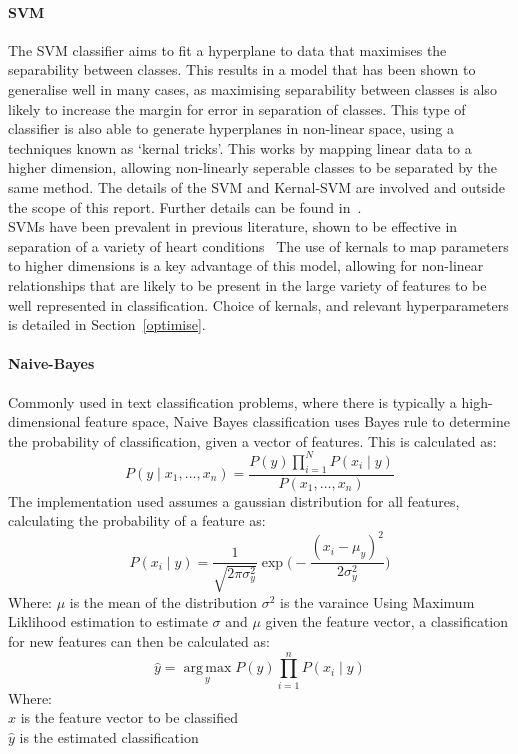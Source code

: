 \documentclass[titlepage, 12pt]{scrartcl} \usepackage{enumitem}
\DeclareMathOperator*{\argmax}{arg\,max}
\begin{document}
\paragraph{SVM}\label{SVM}
The SVM classifier aims to fit a hyperplane to data that maximises the
separability between classes. This results in a model that has been shown to
generalise well in many cases, as maximising separability between classes is
also likely to increase the margin for error in separation of classes. This
type of classifier is also able to generate hyperplanes in non-linear space,
using a techniques known as `kernal tricks'. This works by mapping linear data
to a higher dimension, allowing non-linearly seperable classes to be separated
by the same method. The details of the SVM and Kernal-SVM are involved and
outside the scope of this report. Further details can be found
in~\parencite[p.187]{Tobergte2013a}.\\
SVMs have been prevalent in previous literature, shown to be effective in
separation of a variety of heart conditions~\parencite{Ari2010} The use of
kernals to map parameters to higher dimensions is a key advantage of this
model, allowing for non-linear relationships that are likely to be present in
the large variety of features to be well represented in classification. Choice
of kernals, and relevant hyperparameters is detailed in Section~\ref{optimise}.

\paragraph{Naive-Bayes}
Commonly used in text classification problems, where there is typically a
high-dimensional feature space, Naive Bayes classification uses Bayes rule to
determine the probability of classification, given a vector of features. This
is calculated as:
\begin{equation}
    P(y\mid x_1,\ldots,x_n)=\frac{P(y)\prod\limits_{i=1}^{N}P(x_i\mid y)}{P(x_1,\ldots,x_n)}
\end{equation}
The implementation used assumes a gaussian distribution for all features,
calculating the probability of a feature as:
\begin{equation}
    P(x_i\mid y)=\frac{1}{\sqrt{2\pi
    \sigma_y^2}}\exp\bigg(-\frac{(x_i-\mu_y)^2}{2\sigma^2_y}\bigg)
\end{equation}
Where:
$\mu$ is the mean of the distribution
$\sigma^2$ is the varaince
Using Maximum Liklihood estimation to estimate $\sigma$ and $\mu$ given the
feature vector, a classification for new features can then be calculated as:
\begin{equation}
    \hat{y}=\argmax\limits_y P(y)\prod\limits_{i=1}^nP(x_i\mid y)
\end{equation}
Where:\\
$x$ is the feature vector to be classified\\
$\hat{y}$ is the estimated classification\\
\end{document}
